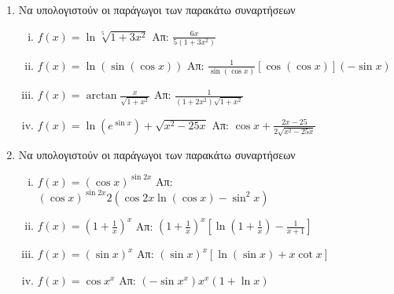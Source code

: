 



\pagestyle{askhseis}




\begin{center}
  \minibox{\large \bfseries \textcolor{Col1}{Ασκήσεις στις Παραγώγους}}
\end{center}

\vspace{\baselineskip}

\begin{enumerate}
  \item Να υπολογιστούν οι παράγωγοι των παρακάτω συναρτήσεων
    \begin{enumerate}[(i)]
      \item $ f(x) = \ln{\sqrt[5]{1+3x^{2}}} $ \hfill Απ: $ \frac{6x}{5(1+3x^{2})} $
      \item $ f(x) = \ln({\sin({\cos{x}})}) $ \hfill Απ: $ \frac{1}{\sin{(\cos{x})}} [\cos{(\cos{x})}] (- \sin{x}) $ 
      \item $ f(x) = \arctan \frac{x}{\sqrt{1 + x^{2}}} $ \hfill Απ: $ \frac{1}{(1+2x^{2})\sqrt{1 + x^{2}}} $
      \item $ f(x) = \ln{(e^{\sin{x}})} + \sqrt{x^{2} - 25x} $ \hfill Απ: $ \cos{x} + \frac{2x - 25}{2 \sqrt{x^{2} - 25x}}  $  
    \end{enumerate}

  \item  Να υπολογιστούν οι παράγωγοι των παρακάτω συναρτήσεων
    \begin{enumerate}[(i)]
      \item $ f(x) = (\cos{x})^{\sin{2x}} $ \hfill Απ: $ (\cos{x})^{\sin{2x}} 2(\cos{2x} \ln{(\cos{x})} - \sin^{2}{x}) $
      \item $ f(x) = \left(1 + \frac{1}{x} \right)^{x} $ \hfill Απ: $ \left(1 + \frac{1}{x}\right)^{x}\left[\ln{(1 + \frac{1}{x})} - \frac{1}{x+1}\right] $
      \item $ f(x) = (\sin{x})^{x} $ \hfill Απ: $ (\sin{x})^{x}[\ln{(\sin{x})} + x \cot{x}] $ 
      \item $ f(x) =  \cos{x}^{x} $ \hfill Απ: $ (- \sin{x^{x}})x^{x} (1 + \ln{x}) $
    \end{enumerate}


\end{enumerate}

